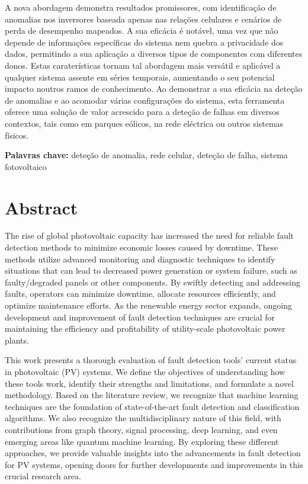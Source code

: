 A nova abordagem demonstra resultados promissores, com identificação de anomalias nos inversores baseada apenas nas relações celulares e cenários de perda de desempenho mapeados. A sua eficácia é notável, uma vez que não depende de informações específicas do sistema nem quebra a privacidade dos dados, permitindo a sua aplicação a diversos tipos de componentes com diferentes donos. Estas caraterísticas tornam tal abordagem mais versátil e aplicável a qualquer sistema assente em séries temporais, aumentando o seu potencial impacto noutros ramos de conhecimento. Ao demonstrar a sua eficácia na deteção de anomalias e ao acomodar várias configurações do sistema, esta ferramenta oferece uma solução de valor acrescido para a deteção de falhas em diversos contextos, tais como em parques eólicos, na rede eléctrica ou outros sistemas físicos.

\bigskip

\textbf{Palavras chave:} deteção de anomalia, rede celular, deteção de falha, sistema fotovoltaico

\chapter*{Abstract}
The rise of global photovoltaic capacity has increased the need for reliable fault detection methods to minimize economic losses caused by downtime. These methods utilize advanced monitoring and diagnostic techniques to identify situations that can lead to decreased power generation or system failure, such as faulty/degraded panels or other components. By swiftly detecting and addressing faults, operators can minimize downtime, allocate resources efficiently, and optimize maintenance efforts. As the renewable energy sector expands, ongoing development and improvement of fault detection techniques are crucial for maintaining the efficiency and profitability of utility-scale photovoltaic power plants.

This work presents a thorough evaluation of fault detection tools' current status in photovoltaic (PV) systems. We define the objectives of understanding how these tools work, identify their strengths and limitations, and formulate a novel methodology. Based on the literature review, we recognize that machine learning techniques are the foundation of state-of-the-art fault detection and classification algorithms. We also recognize the multidisciplinary nature of this field, with contributions from graph theory, signal processing, deep learning, and even emerging areas like quantum machine learning. By exploring these different approaches, we provide valuable insights into the advancements in fault detection for PV systems, opening doors for further developments and improvements in this crucial research area.


